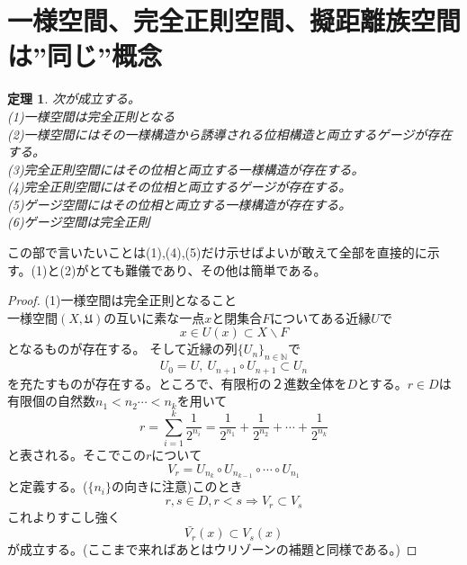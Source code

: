 \documentclass[leqno]{jsarticle}
\newtheorem{thm}{定理}
\begin{document}
\section{一様空間、完全正則空間、擬距離族空間は”同じ”概念}
\begin{thm}次が成立する。\\
(1)一様空間は完全正則となる\\
(2)一様空間にはその一様構造から誘導される位相構造と両立するゲージが存在する。\\
(3)完全正則空間にはその位相と両立する一様構造が存在する。\\
(4)完全正則空間にはその位相と両立するゲージが存在する。\\
(5)ゲージ空間にはその位相と両立する一様構造が存在する。\\
(6)ゲージ空間は完全正則
\end{thm}
この部で言いたいことは(1),(4),(5)だけ示せばよいが敢えて全部を直接的に示す。(1)と(2)がとても難儀であり、その他は簡単である。
\begin{proof}(1)一様空間は完全正則となること\\
一様空間$(X,\mathfrak{U})の互いに素な一点xと閉集合Fについてある近縁Uで$\[x \in U(x)\subset X\backslash F\]となるものが存在する。
そして近縁$の列\{U_{n}\}_{n\in \mathbb{N}}$で
\[
U_{0}=U,\ U_{n+1}\circ U_{n+1}\subset U_{n}
\]を充たすものが存在する。ところで、有限桁の２進数全体を$D$とする。$r\in D$は有限個の自然数$n_{1}<n_{2}\cdots <n_{k}$を用いて
\[
r=\sum_{i=1}^{k}\frac{1}{2^{n_{i}}}=\frac{1}{2^{n_{1}}}+\frac{1}{2^{n_{2}}}+\cdots+\frac{1}{2^{n_{k}}}
\]と表される。そこで$このrについて$
\[
V_r=U_{n_{k}}\circ U_{n_{k-1}}\circ \cdots \circ U_{n_{1}}
\]と定義する。($\{n_{i}\}の$向きに注意)このとき
\[
r,s\in D,r<s\Rightarrow V_r\subset V_s
\]これよりすこし強く	
\[
\bar{V_r}(x)\subset V_s(x)
\]が成立する。(ここまで来ればあとはウリゾーンの補題と同様である。)

\end{proof}
\end{document}
